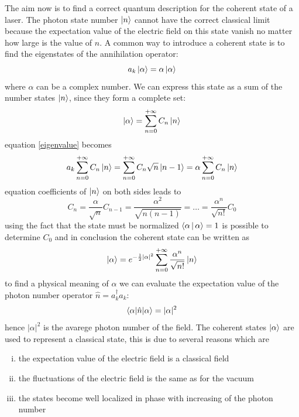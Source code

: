 \documentclass[12pt]{book}
\begin{document}
The aim now is to find a correct quantum description for the coherent state of a laser. The photon state number $\Ket{n}$ cannot have the correct classical limit because the expectation value of the electric field on this state vanish no matter how large is the value of $n$. A common way to introduce a coherent state is to find the eigenstates of the annihilation operator:
\begin{equation}\label{eigenvalue}
a_k\ket{\alpha} = \alpha \ket{\alpha}
\end{equation}
where $\alpha$ can be a complex number. We can express this state as a sum of the number states $\ket{n}$, since they form a complete set:
\begin{equation}\ket{\alpha} = \sum_{n=0}^{+\infty} C_n \ket{n}\end{equation}
equation \eqref{eigenvalue} becomes
\begin{equation}a_k\sum_{n=0}^{+\infty} C_n \ket{n} = \sum_{n=0}^{+\infty} C_n\sqrt{n}\ket{n-1} =\alpha\sum_{n=0}^{+\infty} C_n \ket{n}\end{equation}
equation coefficients of $\ket{n}$ on both sides leads to
\begin{equation}C_n = \frac{\alpha}{\sqrt{n}}C_{n-1} = \frac{\alpha^2}{\sqrt{n(n-1)}} = \dots = \frac{\alpha^n}{\sqrt{n!}}C_0\end{equation}
using the fact that the state must be normalized $\Braket{\alpha|\alpha} = 1$ is possible to determine $C_0$ and in conclusion the coherent state can be written as
\begin{equation}\label{coherentstate}
\ket{\alpha} = e^{-\frac{1}{2}|\alpha|^2}\sum_{n=0}^{+\infty} \frac{\alpha^n}{\sqrt{n!}}\ket{n}
\end{equation}
to find a physical meaning of $\alpha$ we can evaluate the expectation value of the photon number operator $\hat{n} = a_k^\dagger a_k$:
\begin{equation}\braket{\alpha|\hat{n}|\alpha} = |\alpha|^2 \end{equation}
hence $|\alpha|^2$ is the avarege photon number of the field. The coherent states $\ket{\alpha}$ are used to represent a classical state, this is due to several reasons which are
\begin{enumerate}[(i)]
\item the expectation value of the electric field is a classical field
\item the fluctuations of the electric field is the same as for the vacuum
\item the states become well localized in phase with increasing of the photon number
\end{enumerate}
\end{document}
